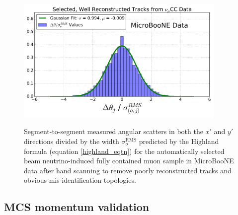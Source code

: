 \documentclass[a4paper,11pt]{article}
\begin{document}
\begin{figure}[ht!]
\centering
	\includegraphics[width=0.9\textwidth]{Figures/Highland_validation_DataBNBSelectedRecoTrack_goodscan.png} \\
\caption{Segment-to-segment measured angular scatters in both the $x'$ and $y'$ directions divided by the width $\sigma_o^{\text{RMS}}$ predicted by the Highland formula (equation \ref{highland_eqtn}) for the automatically selected beam neutrino-induced fully contained muon sample in MicroBooNE data after hand scanning to remove poorly reconstructed tracks and obvious mis-identification topologies.}\label{Highland_validation_fig}
\end{figure}


\subsection{MCS momentum validation}\label{MCS_Momentum_Validation_DataRecoTrack_section}
\end{document}

